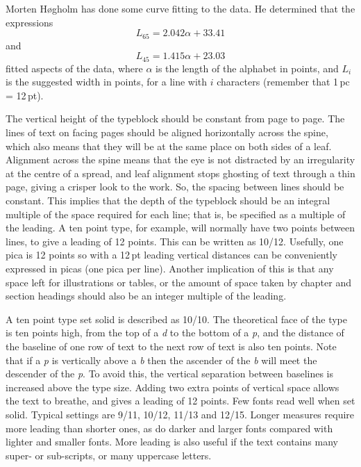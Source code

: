 \documentclass[10pt,a4paper,oneside,extrafontsizes]{memoir}%
\newcommand\U[2]{\textrm{#1}\,\textrm{#2}}
\begin{document}
\begin{paracol}{2}
\switchEng
    Morten H{\o}gholm has done some curve fitting
to the data. He determined that the expressions
\begin{equation}
L_{65} = 2.042\alpha + 33.41 \label{eq:L65}
\end{equation}
and
\begin{equation}
L_{45} = 1.415\alpha + 23.03 \label{eq:L45}
\end{equation}
fitted aspects of the data, where $\alpha$ is the length of the alphabet
in points, and $L_{i}$ is the suggested width in points, for a line with
$i$ characters (remember that \U{1}{pc} = \U{12}{pt}).

   The vertical height of the typeblock should be constant from page to
page. The lines of text on facing pages should be aligned
horizontally across the spine, which also means that they will be at
the same place on both sides of a leaf. Alignment across the spine
means that the eye is not distracted by an irregularity at the centre
of a spread, and leaf alignment stops ghosting of text through a thin page,
giving a crisper look to the work. 
So, the spacing between lines should
be constant. This implies that the depth of the typeblock should be an
integral multiple of the space required for each line; that is, be specified
as a multiple of the leading. A ten point type, for example, will normally
have two points between lines, to give a leading of 12 points. This can be
written as 10/12. Usefully, one pica is 12 points so with a \U{12}{pt} leading
vertical distances can be conveniently expressed in picas 
(one pica per line). Another implication of this is that any space left 
for illustrations or tables, or
the amount of space taken by chapter and section headings 
should also be
an integer multiple of the leading.

    A ten point type set solid is described as 10/10. The theoretical
face of the type is ten points high, from the top of a \emph{d} to the bottom
of a \emph{p}, and the distance of the baseline of one row of text to the
next row of text is also ten points. Note that if a \emph{p} is vertically
above a \emph{b} then the ascender of the \emph{b} will meet the descender
of the \emph{p}. To avoid this, the vertical separation between baselines 
is increased above the type size. Adding two extra points of vertical space
allows the text to breathe, and gives a leading of 12 points. Few fonts
read well when set solid. Typical settings are 9/11, 10/12, 11/13 and 12/15.
Longer measures require more leading than shorter ones, as do darker 
and larger
fonts compared with lighter and smaller fonts. More leading is also
useful if the text contains many super- or 
sub-scripts, or many uppercase letters.
\end{paracol}
\end{document}

